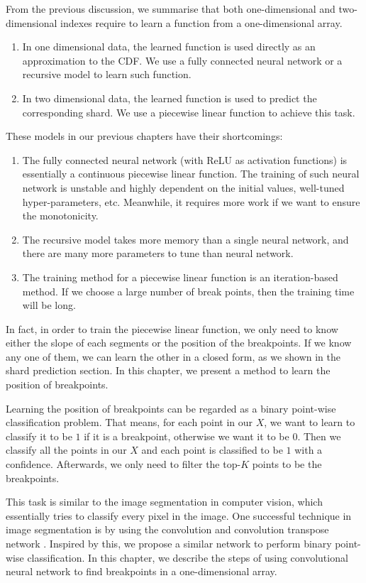 From the previous discussion, we summarise that both one-dimensional and two-dimensional indexes require to learn a function from a one-dimensional array. 
\begin{enumerate}
	\item In one dimensional data, the learned function is used directly as an approximation to the CDF. We use a fully connected neural network or a recursive model to learn such function.
	\item In two dimensional data, the learned function is used to predict the corresponding shard. We use a piecewise linear function to achieve this task.
\end{enumerate}

These models in our previous chapters have their shortcomings:

\begin{enumerate}
	\item The fully connected neural network (with ReLU as activation functions) is essentially a continuous piecewise linear function. The training of such neural network is unstable and highly dependent on the initial values, well-tuned hyper-parameters, etc. Meanwhile, it requires more work if we want to ensure the monotonicity.
	\item The recursive model takes more memory than a single neural network, and there are many more parameters to tune than neural network. 
	\item The training method for a piecewise linear function is an iteration-based method. If we choose a large number of break points, then the training time will be long.
\end{enumerate}

In fact, in order to train the piecewise linear function, we only need to know either the slope of each segments or the position of the breakpoints. If we know any one of them, we can learn the other in a closed form, as we shown in the shard prediction section. In this chapter, we present a method to learn the position of breakpoints.

Learning the position of breakpoints can be regarded as a binary point-wise classification problem. That means, for each point in our $X$, we want to learn to classify it to be $1$ if it is a breakpoint, otherwise we want it to be $0$. Then we classify all the points in our $X$ and each point is classified to be $1$ with a confidence. Afterwards, we only need to filter the top-$K$ points to be the breakpoints.

This task is similar to the image segmentation in computer vision, which essentially tries to classify every pixel in the image. One successful technique in image segmentation is by using the convolution and convolution transpose network \cite{long2015fully}. Inspired by this, we propose a similar network to perform binary point-wise classification. In this chapter, we describe the steps of using convolutional neural network to find breakpoints in a one-dimensional array.


